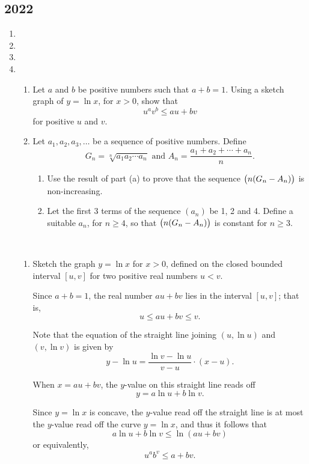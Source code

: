 \subsection*{2022}
\begin{enumerate}
\item 

\item 

\item 

\item \begin{enumerate}[label=(\alph*)]
\item Let $a$ and $b$ be positive numbers such that $a+b=1$. Using a sketch graph of $y=\ln x$, for $x>0$, show that
\[ u^av^b\le au+bv \]
for positive $u$ and $v$.

\item Let $a_1,a_2,a_3,\dots$ be a sequence of positive numbers. Define
\[ G_n=\sqrt[n]{a_1a_2\cdots a_n}\text{ and }A_n=\frac{a_1+a_2+\cdots+a_n}{n}. \]
\begin{enumerate}[label=(\roman*)]
    \item Use the result of part (a) to prove that the sequence $\left(n(G_n-A_n)\right)$ is non-increasing.
    \item Let the first 3 terms of the sequence $(a_n)$ be 1, 2 and 4. Define a suitable $a_n$, for $n\ge4$, so that $\left(n(G_n-A_n)\right)$ is constant for $n\ge3$.
\end{enumerate}
\end{enumerate}

\begin{solution} \
\begin{enumerate}[label=(\alph*)]
\item Sketch the graph $y=\ln x$ for $x>0$, defined on the closed bounded interval $[u,v]$ for two positive real numbers $u<v$.

Since $a+b=1$, the real number $au+bv$ lies in the interval $[u,v]$; that is,
\[ u\le au+bv\le v. \]

Note that the equation of the straight line joining $(u,\ln u)$ and $(v,\ln v)$ is given by
\[ y-\ln u=\frac{\ln v-\ln u}{v-u}\cdot(x-u). \]

When $x=au+bv$, the $y$-value on this straight line reads off
\[ y=a\ln u+b\ln v. \]

Since $y=\ln x$ is concave, the $y$-value read off the straight line is at most the $y$-value read off the curve $y=\ln x$, and thus it follows that
\[ a\ln u+b\ln v\le\ln(au+bv) \]
or equivalently,
\[ u^ab^v\le a+bv. \]


\end{enumerate}
\end{solution}
\end{enumerate}
